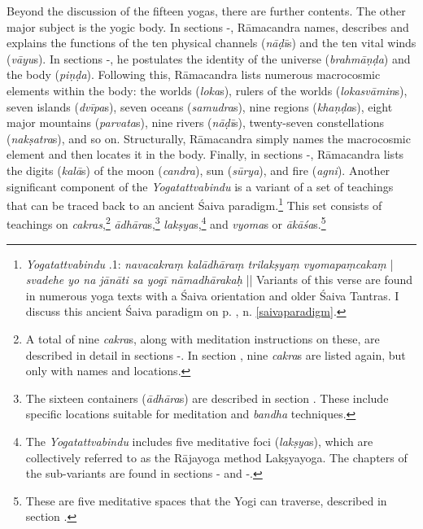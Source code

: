 Beyond the discussion of the fifteen yogas, there are further contents. The other major subject is the yogic body. In sections -, Rāmacandra names, describes and explains the functions of the ten physical channels (\textit{nāḍī}s) and the ten vital winds (\textit{vāyu}s). In sections -, he postulates the identity of the universe (\textit{brahmāṇḍa}) and the body (\textit{piṇḍa}). Following this, Rāmacandra lists numerous macrocosmic elements within the body: the worlds (\textit{loka}s), rulers of the worlds (\textit{lokasvāmin}s), seven islands (\textit{dvīpa}s), seven oceans (\textit{samudra}s), nine regions (\textit{khaṇḍa}s), eight major mountains (\textit{parvata}s), nine rivers (\textit{nāḍī}s), twenty-seven constellations (\textit{nakṣatra}s), and so on. Structurally, Rāmacandra simply names the macrocosmic element and then locates it in the body. Finally, in sections -, Rāmacandra lists the digits (\textit{kalā}s) of the moon (\textit{candra}), sun (\textit{sūrya}), and fire (\textit{agni}). Another significant component of the \emph{Yogatattvabindu} is a variant of a set of teachings that can be traced back to an ancient Śaiva paradigm.\footnote{\emph{Yogatattvabindu} .1: \textit{navacakraṃ kalādhāraṃ trilakṣyaṃ vyomapaṃcakaṃ} | \textit{svadehe yo na jānāti sa yogī nāmadhārakaḥ} || Variants of this verse are found in numerous yoga texts with a Śaiva orientation and older Śaiva Tantras. I discuss this ancient Śaiva paradigm on p. \pageref{saivaparadigm}, n. \ref{saivaparadigm}.} This set consists of teachings on \textit{cakras},\footnote{A total of nine \textit{cakra}s, along with meditation instructions on these, are described in detail in sections -. In section , nine \textit{cakra}s are listed again, but only with names and locations.} \textit{ādhāra}s,\footnote{The sixteen containers (\textit{ādhāra}s) are described in section . These include specific locations suitable for meditation and \textit{bandha} techniques.} \textit{lakṣya}s,\footnote{The \emph{Yogatattvabindu} includes five meditative foci (\textit{lakṣya}s), which are collectively referred to as the Rājayoga method Lakṣyayoga. The chapters of the sub-variants are found in sections - and -.} and \textit{vyoma}s or \textit{ākāśa}s.\footnote{These are five meditative spaces that the Yogi can traverse, described in section .}

